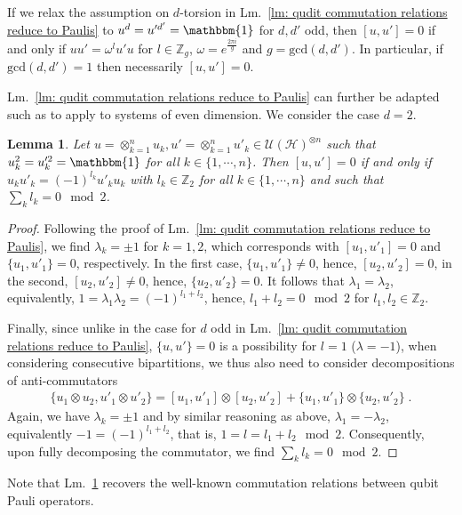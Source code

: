 \documentclass[aps,pra,letterpaper,onrcolumn,nofootinbib,notitlepage,longbibliography]{revtex4-1}
\newtheorem{lemma}{Lemma}
\newcommand{\mf}[1]{#1}
\newcommand{\UH}{\mc{U}(\cH)}
\newcommand{\zz}{\mathbb Z}
\newcommand\mc[1]{\mathcal{#1}}
\newcommand{\cH}{\mc{H}}
\begin{document}
If we relax the assumption on $d$-torsion in Lm.~\ref{lm: qudit commutation relations reduce to Paulis} \mf{to $u^d=u'^{d'}=\mathbbm{1}$ for $d,d'$ odd}, then $[u,u']=0$ if and only if $uu'=\omega^lu'u$ for $l\in\zz_{g}$, $\omega=e^{\frac{2\pi i}{g}}$ and $g=\mathrm{gcd}(d,d')$. In particular, if $\mathrm{gcd}(d,d')=1$ then necessarily $[u,u']=0$.

Lm.~\ref{lm: qudit commutation relations reduce to Paulis} can further be adapted such as to apply to systems of even dimension. We consider the case $d=2$.

\begin{lemma}\label{lm: qubit commutation relations reduce to Paulis}
    Let $u=\otimes_{k=1}^n u_k, u'=\otimes_{k=1}^n u'_k \in\UH^{\otimes n}$ such that $u_k^2=u'^2_k=\mathbbm{1}$ for all $k\in\{1,\cdots,n\}$. Then $[u,u']=0$ if and only if $u_ku'_k=(-1)^{l_k}u'_ku_k$ with $l_k\in\zz_2$ for all $k\in\{1,\cdots,n\}$ and such that $\sum_k l_k=0\mod 2$.
\end{lemma}

\begin{proof}
    \mf{Following the proof of Lm.~\ref{lm: qudit commutation relations reduce to Paulis}}, we find $\lambda_k=\pm 1$ for $k=1,2$, which corresponds with $[u_1,u'_1]=0$ and $\{u_1,u'_1\}=0$, respectively. In the first case, $\{u_1,u'_1\}\neq 0$, hence, $[u_2,u'_2]=0$, in the second, $[u_2,u'_2]\neq 0$, hence, $\{u_2,u'_2\}=0$. It follows that $\lambda_1=\lambda_2$, equivalently, $1=\lambda_1\lambda_2=(-1)^{l_1+l_2}$, hence, $l_1+l_2=0\mod 2$ for $l_1,l_2\in\zz_2$.

    Finally, since unlike in the case for $d$ odd in Lm.~\ref{lm: qudit commutation relations reduce to Paulis}, $\{u,u'\}=0$ is a possibility for $l=1$ ($\lambda=-1$), when considering consecutive bipartitions, we thus also need to consider decompositions of anti-commutators
    \begin{align*}
        \{u_1\otimes u_2,u'_1\otimes u'_2\}=[u_1,u'_1]\otimes[u_2,u'_2]+\{u_1,u'_1\}\otimes\{u_2,u'_2\}\; .
    \end{align*}
    Again, we have $\lambda_k=\pm 1$ and by similar reasoning as above, $\lambda_1=-\lambda_2$, equivalently $-1=(-1)^{l_1+l_2}$, that is, $1=l=l_1+l_2\mod 2$. Consequently, upon fully decomposing the commutator, we find $\sum_k l_k=0\mod 2$.
\end{proof}

Note that Lm.~\ref{lm: qubit commutation relations reduce to Paulis} recovers the well-known commutation relations between qubit Pauli operators.
\end{document}
